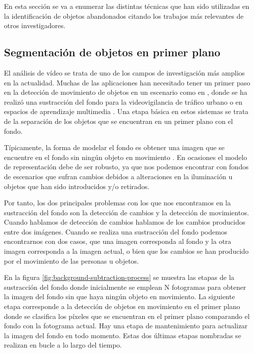 En esta sección se va a enumerar las distintas técnicas que han sido utilizadas en la identificación de objetos abandonados citando los trabajos más relevantes de otros investigadores.

\subsection{Segmentación de objetos en primer plano}
\label{subsec:tecnicas-segmentacion-obj-primer-plano}

El análisis de vídeo se trata de uno de los campos de investigación más amplios en la actualidad. Muchas de las aplicaciones han necesitado tener un primer paso en la detección de movimiento de objetos en un escenario como en \cite{cheung2005robust}, donde se ha realizó una sustracción del fondo para la videovigilancia de tráfico urbano o en espacios de aprendizaje multimedia \cite{4381122}. Una etapa básica en estos sistemas se trata de la separación de los objetos que se encuentran en un primer plano con el fondo.

Típicamente, la forma de modelar el fondo es obtener una imagen que se encuentre en el fondo sin ningún objeto en movimiento \cite{BOUWMANS201431}. En ocasiones el modelo de representación debe de ser robusto, ya que nos podemos encontrar con fondos de escenarios que sufran cambios debidos a alteraciones en la iluminación u objetos que han sido introducidos y/o retirados.

Por tanto, los dos principales problemas con los que nos encontramos en la sustracción del fondo son la detección de cambios y la detección de movimientos. Cuando hablamos de detección de cambios hablamos de los cambios producidos entre dos imágenes. Cuando se realiza una sustracción del fondo podemos encontrarnos con dos casos, que una imagen corresponda al fondo y la otra imagen corresponda a la imagen actual, o bien que los cambios se han producido por el movimiento de las personas u objetos.

En la figura \ref{fig:background-subtraction-process} se muestra las etapas de la sustracción del fondo donde inicialmente se emplean N fotogramas para obtener la imagen del fondo sin que haya ningún objeto en movimiento. La siguiente etapa corresponde a la detección de objetos en movimiento en el primer plano donde se clasifica los píxeles que se encuentran en el primer plano comparando el fondo con la fotograma actual. Hay una etapa de mantenimiento para actualizar la imagen del fondo en todo momento. Estas dos últimas etapas nombradas se realizan en bucle a lo largo del tiempo.

